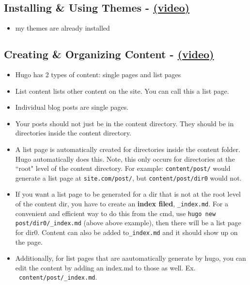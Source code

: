 \subsection{Installing \& Using Themes - \href{https://youtu.be/L34JL_3Jkyc?list=PLLAZ4kZ9dFpOnyRlyS-liKL5ReHDcj4G3}{(video)} }
\begin{itemize}
\item my themes are already installed
\end{itemize}

\subsection{Creating \& Organizing Content - \href{https://youtu.be/0GZxidrlaRM?list=PLLAZ4kZ9dFpOnyRlyS-liKL5ReHDcj4G3}{(video)} }
\begin{itemize}
\item
	Hugo has 2 types of content: single pages and list pages
\item
	List content lists other content on the site. You can call this a list page.
\item
	Individual blog posts are single pages.
\item
	Your posts should not just be in the content directory. They should be in directories inside the content directory.
\item
	A list page is automatically created for directories inside the content folder.  Hugo automatically does this. Note, this only occurs for directories at the ``root" level of the content directory. For example:  \texttt{content/post/} would generate a list page at \texttt{site.com/post/}, but \texttt{content/post/dir0} would not.
\item
	If you want a list page to be generated for a dir that is not at the root level of the content dir, you have to create an \textbf{index filed}, \texttt{\_index.md}. For a convenient and efficient way to do this from the cmd, use \texttt{hugo new post/dir0/\_index.md} (above above example), then there will be a list page for dir0. 	Content can also be added to\texttt{\_index.md} and it should show up on the page.
\item
	Additionally, for list pages that are aautomatically generate by hugo, you can edit the content by adding an index.md to those as well. Ex. \texttt{~content/post/\_index.md}.
\end{itemize}

